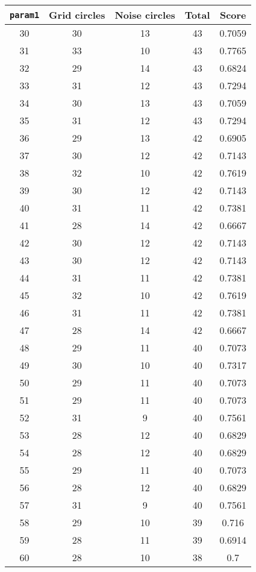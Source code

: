 \documentclass[letterpaper, 12pt]{article}
\begin{document}
\begin{longtable}{|c|c|c|c|c|}
\hline
\textbf{\texttt{param1}} & \textbf{Grid circles} & \textbf{Noise circles} & \textbf{Total} & \textbf{Score} \\
\hline
30 & 30 & 13 & 43 & 0.7059 \\
\hline
31 & 33 & 10 & 43 & 0.7765 \\
\hline
32 & 29 & 14 & 43 & 0.6824 \\
\hline
33 & 31 & 12 & 43 & 0.7294 \\
\hline
34 & 30 & 13 & 43 & 0.7059 \\
\hline
35 & 31 & 12 & 43 & 0.7294 \\
\hline
36 & 29 & 13 & 42 & 0.6905 \\
\hline
37 & 30 & 12 & 42 & 0.7143 \\
\hline
38 & 32 & 10 & 42 & 0.7619 \\
\hline
39 & 30 & 12 & 42 & 0.7143 \\
\hline
40 & 31 & 11 & 42 & 0.7381 \\
\hline
41 & 28 & 14 & 42 & 0.6667 \\
\hline
42 & 30 & 12 & 42 & 0.7143 \\
\hline
43 & 30 & 12 & 42 & 0.7143 \\
\hline
44 & 31 & 11 & 42 & 0.7381 \\
\hline
45 & 32 & 10 & 42 & 0.7619 \\
\hline
46 & 31 & 11 & 42 & 0.7381 \\
\hline
47 & 28 & 14 & 42 & 0.6667 \\
\hline
48 & 29 & 11 & 40 & 0.7073 \\
\hline
49 & 30 & 10 & 40 & 0.7317 \\
\hline
50 & 29 & 11 & 40 & 0.7073 \\
\hline
51 & 29 & 11 & 40 & 0.7073 \\
\hline
52 & 31 & 9 & 40 & 0.7561 \\
\hline
53 & 28 & 12 & 40 & 0.6829 \\
\hline
54 & 28 & 12 & 40 & 0.6829 \\
\hline
55 & 29 & 11 & 40 & 0.7073 \\
\hline
56 & 28 & 12 & 40 & 0.6829 \\
\hline
57 & 31 & 9 & 40 & 0.7561 \\
\hline
58 & 29 & 10 & 39 & 0.716 \\
\hline
59 & 28 & 11 & 39 & 0.6914 \\
\hline
60 & 28 & 10 & 38 & 0.7 \\

\end{longtable}
\end{document}
